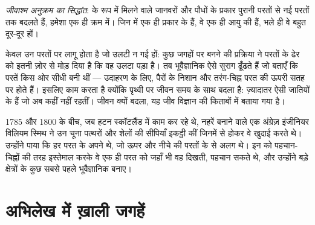 \begin{definition}[जीवाश्म अनुक्रम का सिद्धांत]\label{def:g7:geological-time:fossil-succession}
\emph{जीवाश्म अनुक्रम का सिद्धांत}:  के रूप में मिलने वाले जानवरों और
पौधों के प्रकार पुरानी परतों से नई परतों तक बदलते हैं, हमेशा एक ही क्रम में। जिन
 में एक ही प्रकार के  हैं, वे एक ही आयु की हैं, भले ही वे बहुत दूर-दूर
हों।
\end{definition}


 केवल उन परतों पर लागू होता है जो उलटी न गई हों: कुछ जगहों पर
 बनने की प्रक्रिया ने परतों के ढेर को इतनी ज़ोर से मोड़ दिया है कि वह उलटा पड़ा
है। तब भूवैज्ञानिक ऐसे सुराग ढूँढते हैं जो बताएँ कि परतें किस ओर सीधी बनी थीं ---
उदाहरण के लिए, पैरों के निशान और तरंग-चिह्न परत की ऊपरी सतह पर होते हैं।  इसलिए काम करता है क्योंकि पृथ्वी पर जीवन समय के साथ बदला है:
ज़्यादातर  ऐसी जातियों के हैं जो अब कहीं नहीं रहतीं। जीवन क्यों बदला, यह जीव
विज्ञान की किताबों में बताया गया
है।

\begin{history}[नहरें बनाने वाले विलियम स्मिथ]
1785 और 1800 के बीच, जब हटन स्कॉटलैंड में काम कर रहे थे, नहरें बनाने वाले एक
अंग्रेज़ इंजीनियर विलियम स्मिथ ने उन चूना पत्थरों और शेलों की  सीपियाँ इकट्ठी
कीं जिनमें से होकर वे खुदाई करते थे। उन्होंने पाया कि हर परत के अपने  थे, जो
ऊपर और नीचे की परतों के  से अलग थे। इन  को पहचान-चिह्नों की तरह
इस्तेमाल करके वे एक ही परत को जहाँ भी वह दिखती, पहचान सकते थे, और उन्होंने बड़े
क्षेत्रों के कुछ सबसे पहले भूवैज्ञानिक  बनाए।
\end{history}

\section{अभिलेख में ख़ाली जगहें}

